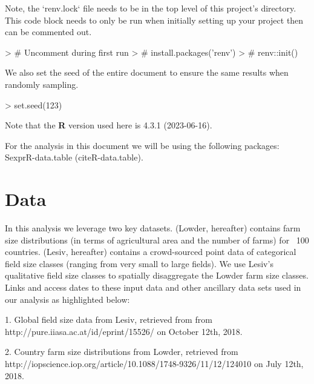 \documentclass{article}
\begin{document}
Note, the `renv.lock` file needs to be in the top level of this project's directory. This code block needs to only be run when initially setting up your project then can be commented out.

\begin{Schunk}
\begin{Sinput}
> # Uncomment during first run
> # install.packages('renv')
> # renv::init()
\end{Sinput}
\end{Schunk}

We also set the seed of the entire document to ensure the same results when randomly sampling.

\begin{Schunk}
\begin{Sinput}
> set.seed(123)
\end{Sinput}
\end{Schunk}


Note that the \textbf{R} version used here is 4.3.1 (2023-06-16).




 
For the analysis in this document we will be using the following packages: Sexpr{R-data.table} (cite{R-data.table}).

\section{Data}

In this analysis we leverage two key datasets. \cite{Lowder} (Lowder, hereafter) contains farm size distributions (in terms of agricultural area and the number of farms) for ~100 countries. \cite{Lesiv} (Lesiv, hereafter) contains a crowd-sourced point data of categorical field size classes (ranging from very small to large fields). We use Lesiv's qualitative field size classes to spatially disaggregate the Lowder farm size classes. Links and access dates to these input data and other ancillary data sets used in our analysis as highlighted below:

1. Global field size data from Lesiv, retrieved from from http://pure.iiasa.ac.at/id/eprint/15526/ on October 12th, 2018.

2. Country farm size distributions from Lowder, retrieved from 
http://iopscience.iop.org/article/10.1088/1748-9326/11/12/124010 on July 12th, 2018.
\end{document}
